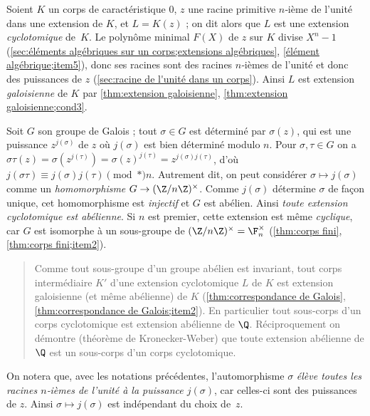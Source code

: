 \documentclass[11pt, useosf,
  title in boldface,
  theorem in new line,
  theorem numbering = section,
  number theorems separately,
]{simplivre}
\begin{document}
    \begin{example*}\label{ex:extensions cyclotomiques}
        Soient \( K \) un corps de caractéristique \( 0 \), \( z \) une racine primitive \( n \)‑ième de l'unité dans une extension de \( K \), et \( L = K(z) \) ; on dit alors que \( L \) est une extension \emph{cyclotomique} de~\( K \). Le polynôme minimal \( F(X) \) de \( z \) sur \( K \) divise \( X^n - 1 \) (\cref{sec:éléments algébriques sur un corps;extensions algébriques}, \ref{élément algébrique;item5}), donc ses racines sont des racines \( n \)‑ièmes de l'unité et donc des puissances de \( z \) (\cref{sec:racine de l'unité dans un corps}). Ainsi \( L \) est extension \emph{galoisienne} de \( K \) par \cref{thm:extension galoisienne}, \ref{thm:extension galoisienne;cond3}.

        Soit \( G \) son groupe de Galois ; tout \( \sigma \in G \) est déterminé par \( \sigma(z) \), qui est une puissance \( z^{j(\sigma)} \) de \( z \) où \( j(\sigma) \) est bien déterminé modulo \( n \). Pour \( \sigma, \tau \in G \) on a \( \sigma\tau(z) = \sigma(z^{j(\tau)}) = \sigma(z)^{j(\tau)} = z^{j(\sigma)j(\tau)} \), d'où \( j(\sigma\tau) \equiv j(\sigma)j(\tau) \pmod*{n} \). Autrement dit, on peut considérer \( \sigma \mapsto j(\sigma) \) comme un \emph{homomorphisme} \( G \to (\Z/n\Z)^\times \). Comme \( j(\sigma) \) détermine \( \sigma \) de façon unique, cet homomorphisme est \emph{injectif} et \( G \) est abélien. Ainsi \emph{toute extension cyclotomique est abélienne}. Si \( n \) est premier, cette extension est même \emph{cyclique}, car \( G \) est isomorphe à un sous-groupe de \( (\Z/n\Z)^\times = \F_n^\times \) (\cref{thm:corps fini}, \ref{thm:corps fini;item2}).
        \begin{quote}
            Comme tout sous-groupe d'un groupe abélien est invariant, tout corps intermédiaire \( K' \) d'une extension cyclotomique \( L \) de \( K \) est extension galoisienne (et même abélienne) de \( K \) (\cref{thm:correspondance de Galois}, \ref{thm:correspondance de Galois;item2}). En particulier tout sous-corps d'un corps cyclotomique est extension abélienne de \( \Q \). Réciproquement on démontre (théorème de Kronecker-Weber) que toute extension abélienne de \( \Q \) est un sous-corps d'un corps cyclotomique.
        \end{quote}
        On notera que, avec les notations précédentes, l'automorphisme \( \sigma \) \emph{élève toutes les racines \( n \)‑ièmes de l'unité à la puissance \( j(\sigma) \)}, car celles-ci sont des puissances de \( z \). Ainsi \( \sigma \mapsto j(\sigma) \) est indépendant du choix de~\( z \).
    \end{example*}
\end{document}
